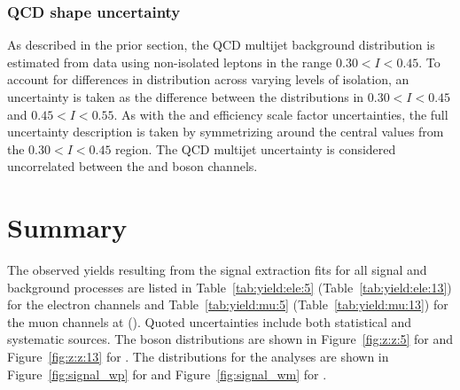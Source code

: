 \subsubsection{QCD shape uncertainty}
As described in the prior section, the QCD multijet background \mt distribution is estimated from data using non-isolated leptons in the range $0.30 < I < 0.45$. To account for differences in \mt distribution across varying levels of isolation, an uncertainty is taken as the difference between the \mt distributions in $0.30 < I < 0.45$ and $0.45 < I < 0.55$. As with the \met and efficiency scale factor uncertainties, the full uncertainty description is taken by symmetrizing around the central values from the $0.30 < I < 0.45$ region.  The QCD multijet uncertainty is considered uncorrelated between the \Wp and \Wm boson channels. 

\section{Summary}

The observed yields resulting from the signal extraction fits for all signal and background processes are listed in Table~\ref{tab:yield:ele:5} (Table~\ref{tab:yield:ele:13}) for the electron channels and Table~\ref{tab:yield:mu:5} (Table~\ref{tab:yield:mu:13}) for the muon channels at \sg (\sh). Quoted uncertainties include both statistical and systematic sources. The \Z boson \mll distributions are shown in Figure~\ref{fig:z:z:5} for \sg and Figure~\ref{fig:z:z:13} for \sh. The \mt distributions for the \W analyses are shown in Figure~\ref{fig:signal_wp} for \Wp and Figure~\ref{fig:signal_wm} for \Wm.

 








